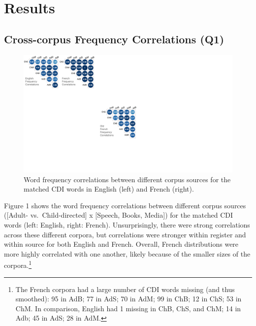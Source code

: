 \documentclass[10pt, letterpaper]{article}
\newenvironment{CodeChunk}{}{}
\begin{document}
\hypertarget{results}{%
\section{Results}\label{results}}

\hypertarget{cross-corpus-frequency-correlations-q1}{%
\subsection{Cross-corpus Frequency Correlations
(Q1)}\label{cross-corpus-frequency-correlations-q1}}

\begin{CodeChunk}
\begin{figure}[t]

{\centering \includegraphics[width=\linewidth]{figs/corpus_freq_cors_hor} 

}

\caption[Word frequency correlations between different corpus sources for the matched CDI words in English (left) and French (right)]{Word frequency correlations between different corpus sources for the matched CDI words in English (left) and French (right).}\label{fig:fig1}
\end{figure}
\end{CodeChunk}

Figure 1 shows the word frequency correlations between different corpus
sources ({[}Adult- vs.~Child-directed{]} x {[}Speech, Books, Media{]})
for the matched CDI words (left: English, right: French).
Unsurprisingly, there were strong correlations across these different
corpora, but correlations were stronger within register and within
source for both English and French. Overall, French distributions were
more highly correlated with one another, likely because of the smaller
sizes of the corpora.\footnote{The French corpora had a large number of
  CDI words missing (and thus smoothed): 95 in AdB; 77 in AdS; 70 in
  AdM; 99 in ChB; 12 in ChS; 53 in ChM. In comparison, English had 1
  missing in ChB, ChS, and ChM; 14 in Adb; 45 in AdS; 28 in AdM.}
\end{document}
